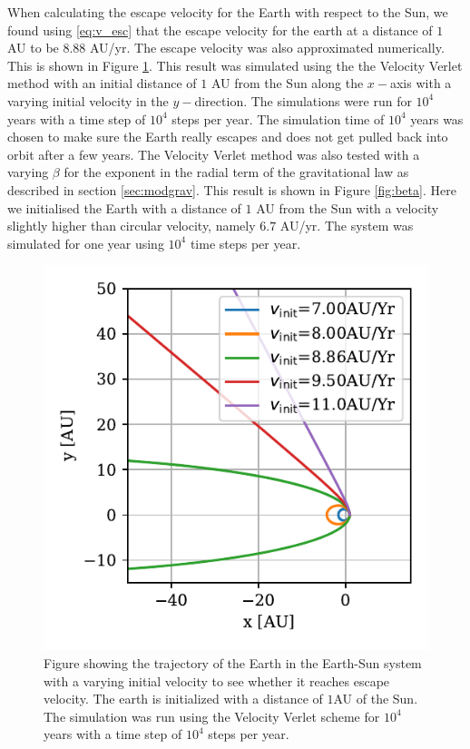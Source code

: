 \documentclass[twocolumn]{aastex62}
\begin{document}
When calculating the escape velocity for the Earth with respect to the Sun, we
found using \ref{eq:v_esc} that the escape velocity for the earth at a distance
of $1$ AU to be $8.88$ AU/yr. The escape velocity was also approximated
numerically. This is shown in Figure \ref{fig:escape}. This result was simulated
using the the Velocity Verlet method with an initial distance of $1$ AU from the
Sun along the $x-$axis with a varying initial velocity in the $y-$direction. The
simulations were run for $10^4$ years with a time step of $10^4$ steps per year.
The simulation time of $10^4$ years was chosen to make sure the Earth really
escapes and does not get pulled back into orbit after a few years. The
Velocity Verlet method was also tested with a varying $\beta$ for the exponent
in the radial term of the gravitational law as described in section
\ref{sec:modgrav}. This result is shown in Figure \ref{fig:beta}. Here we
initialised the Earth with a distance of $1$ AU from the Sun with a velocity
slightly higher than circular velocity, namely $6.7$ AU/yr. The system was
simulated for one year using $10^4$ time steps per year.


\begin{figure}
\includegraphics[scale=1]{Figures/espace.pdf}
\caption{Figure showing the trajectory of the Earth in the Earth-Sun system with a varying initial velocity to see whether it reaches escape velocity. The earth is initialized with a distance of $1$AU of the Sun. The simulation was run using the Velocity Verlet scheme for $10^4$ years with a time step of $10^4$ steps per year.}
\label{fig:escape}
\end{figure}
\end{document}
